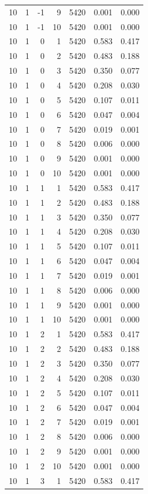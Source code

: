 \begin{table}
\begin{tabular}{rrrrrrr}
10 & 1 & -1 & 9 & 5420 & 0.001 & 0.000 \\
10 & 1 & -1 & 10 & 5420 & 0.001 & 0.000 \\
10 & 1 & 0 & 1 & 5420 & 0.583 & 0.417 \\
10 & 1 & 0 & 2 & 5420 & 0.483 & 0.188 \\
10 & 1 & 0 & 3 & 5420 & 0.350 & 0.077 \\
10 & 1 & 0 & 4 & 5420 & 0.208 & 0.030 \\
10 & 1 & 0 & 5 & 5420 & 0.107 & 0.011 \\
10 & 1 & 0 & 6 & 5420 & 0.047 & 0.004 \\
10 & 1 & 0 & 7 & 5420 & 0.019 & 0.001 \\
10 & 1 & 0 & 8 & 5420 & 0.006 & 0.000 \\
10 & 1 & 0 & 9 & 5420 & 0.001 & 0.000 \\
10 & 1 & 0 & 10 & 5420 & 0.001 & 0.000 \\
10 & 1 & 1 & 1 & 5420 & 0.583 & 0.417 \\
10 & 1 & 1 & 2 & 5420 & 0.483 & 0.188 \\
10 & 1 & 1 & 3 & 5420 & 0.350 & 0.077 \\
10 & 1 & 1 & 4 & 5420 & 0.208 & 0.030 \\
10 & 1 & 1 & 5 & 5420 & 0.107 & 0.011 \\
10 & 1 & 1 & 6 & 5420 & 0.047 & 0.004 \\
10 & 1 & 1 & 7 & 5420 & 0.019 & 0.001 \\
10 & 1 & 1 & 8 & 5420 & 0.006 & 0.000 \\
10 & 1 & 1 & 9 & 5420 & 0.001 & 0.000 \\
10 & 1 & 1 & 10 & 5420 & 0.001 & 0.000 \\
10 & 1 & 2 & 1 & 5420 & 0.583 & 0.417 \\
10 & 1 & 2 & 2 & 5420 & 0.483 & 0.188 \\
10 & 1 & 2 & 3 & 5420 & 0.350 & 0.077 \\
10 & 1 & 2 & 4 & 5420 & 0.208 & 0.030 \\
10 & 1 & 2 & 5 & 5420 & 0.107 & 0.011 \\
10 & 1 & 2 & 6 & 5420 & 0.047 & 0.004 \\
10 & 1 & 2 & 7 & 5420 & 0.019 & 0.001 \\
10 & 1 & 2 & 8 & 5420 & 0.006 & 0.000 \\
10 & 1 & 2 & 9 & 5420 & 0.001 & 0.000 \\
10 & 1 & 2 & 10 & 5420 & 0.001 & 0.000 \\
10 & 1 & 3 & 1 & 5420 & 0.583 & 0.417 \\

\end{tabular}
\end{table}
